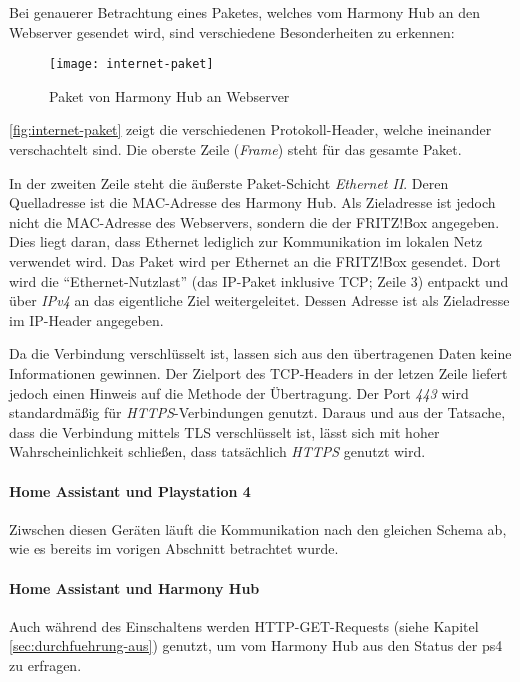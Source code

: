 Bei genauerer Betrachtung eines Paketes, welches vom Harmony Hub an den Webserver gesendet wird,
sind verschiedene Besonderheiten zu erkennen:

\begin{figure}[h!]
    \centering
    \texttt{[image: internet-paket]}
    \caption{Paket von Harmony Hub an Webserver}\label{fig:internet-paket}
\end{figure}


\autoref{fig:internet-paket} zeigt die verschiedenen Protokoll-Header, welche ineinander verschachtelt sind.
Die oberste Zeile (\textit{Frame}) steht für das gesamte Paket.

In der zweiten Zeile steht die äußerste Paket-Schicht \textit{Ethernet II}.
Deren Quelladresse ist die MAC-Adresse des Harmony Hub.
Als Zieladresse ist jedoch nicht die MAC-Adresse des Webservers,
sondern die der FRITZ!Box angegeben.
Dies liegt daran, dass Ethernet lediglich zur Kommunikation im lokalen Netz verwendet wird.
Das Paket wird per Ethernet an die FRITZ!Box gesendet.
Dort wird die \enquote{Ethernet-Nutzlast} (das IP-Paket inklusive TCP; Zeile 3) entpackt und über \textit{IPv4} an das eigentliche Ziel weitergeleitet.
Dessen Adresse ist als Zieladresse im IP-Header angegeben.

Da die Verbindung verschlüsselt ist, lassen sich aus den übertragenen Daten keine Informationen gewinnen.
Der Zielport des TCP-Headers in der letzen Zeile liefert jedoch einen Hinweis auf die Methode der Übertragung.
Der Port \textit{443} wird standardmäßig für \textit{HTTPS}-Verbindungen genutzt.
Daraus und aus der Tatsache, dass die Verbindung mittels TLS verschlüsselt ist,
lässt sich mit hoher Wahrscheinlichkeit schließen, dass tatsächlich \textit{HTTPS} genutzt wird.

\paragraph{Home Assistant und Playstation 4}
Ziwschen diesen Geräten läuft die Kommunikation nach den gleichen Schema ab,
wie es bereits im vorigen Abschnitt betrachtet wurde.

\paragraph{Home Assistant und Harmony Hub}
Auch während des Einschaltens werden HTTP-GET-Requests (siehe Kapitel \ref{sec:durchfuehrung-aus}) genutzt,
um vom Harmony Hub aus den Status der \ac{ps4} zu erfragen.

